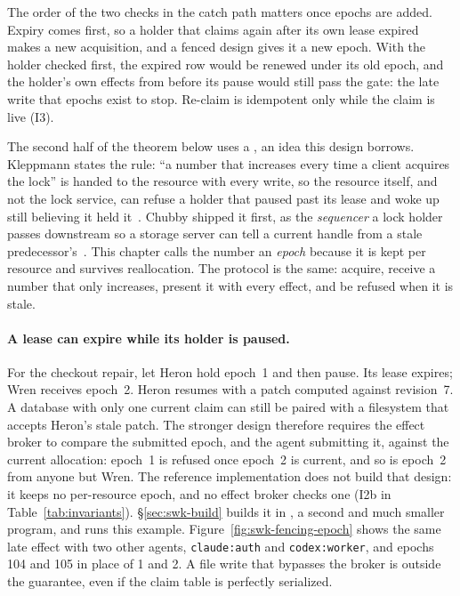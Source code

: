 \documentclass[11pt,a4paper]{article}
\theoremstyle{definition}
\theoremstyle{remark}
\begin{document}
The order of the two checks in the catch path matters once epochs are added.
Expiry comes first, so a holder that claims again after its own lease expired
makes a new acquisition, and a fenced design gives it a new epoch. With the
holder checked first, the expired row would be renewed under its old epoch,
and the holder's own effects from before its pause would still pass the gate:
the late write that epochs exist to stop. Re-claim is idempotent only while
the claim is live (I3).

The second half of the theorem below uses a , an idea
this design borrows. Kleppmann states the rule: ``a number that increases every
time a client acquires the lock'' is handed to the resource with every write,
so the resource itself, and not the lock service, can refuse a holder that
paused past its lease and woke up still believing it held
it~. Chubby shipped it first, as the
\emph{sequencer} a lock holder passes downstream so a storage server can tell a
current handle from a stale predecessor's~. This
chapter calls the number an \emph{epoch} because it is kept per resource and
survives reallocation. The protocol is the same: acquire, receive a number that
only increases, present it with every effect, and be refused when it is stale.

\paragraph{A lease can expire while its holder is paused.}
For the checkout repair, let Heron hold epoch~1 and then pause. Its lease
expires; Wren receives epoch~2. Heron resumes with a patch computed against
revision~7. A database with only one current claim can still be paired with a
filesystem that accepts Heron's stale patch. The stronger design therefore
requires the effect broker to compare the submitted epoch, and the agent
submitting it, against the current allocation: epoch~1 is refused once epoch~2
is current, and so is epoch~2 from anyone but Wren. The reference
implementation does not build that design: it keeps no per-resource epoch, and
no effect broker checks one (I2b in Table~\ref{tab:invariants}).
\S\ref{sec:swk-build} builds it in \pdkernelname{}, a second and much
smaller program, and runs this example.
Figure~\ref{fig:swk-fencing-epoch} shows the same late effect with two other
agents, \texttt{claude:auth} and \texttt{codex:worker}, and epochs 104 and 105
in place of 1 and 2. A file write that
bypasses the broker is outside the guarantee, even if the claim table is
perfectly serialized.
\end{document}
